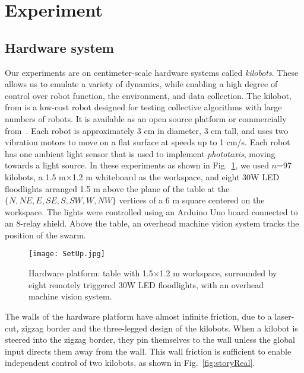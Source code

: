 
\section{Experiment}\label{sec:expResults}



\subsection{Hardware system}


Our experiments are on centimeter-scale hardware systems called \emph{kilobots}.  These allows us to emulate a variety of dynamics, while enabling a high degree of control over robot function, the environment, and data collection. The kilobot, from \citet{Rubenstein2012,rubenstein2014programmable} is a low-cost robot designed for testing collective algorithms with large numbers of robots. It is available as an open source platform or commercially from~\citet{K-Team2015}.  Each robot is approximately 3 cm in diameter, 3 cm tall, and uses two vibration motors to move on a flat surface at speeds up to 1 cm/s.  Each robot has one ambient light sensor that is used to implement \emph{phototaxis},  moving towards a light source. 
In these experiments as shown in Fig.~\ref{fig:setup}, we used $n$=97 kilobots, a 1.5 m$\times$1.2 m whiteboard as the workspace, and eight 30W LED floodlights arranged 1.5 m above the plane of the table at the $\{N,NE,E,SE,S,SW,W,NW\}$ vertices of a 6 m square centered on the workspace. The lights were controlled using an Arduino Uno board connected to an 8-relay shield.  Above  the table, an overhead machine vision system tracks the position of the swarm.


\begin{figure}
\begin{center}
	\texttt{[image: SetUp.jpg]}
\end{center}
\vspace{-1em}
\caption{\label{fig:setup}
Hardware platform:  table with 1.5$\times$1.2 m workspace, surrounded by eight remotely triggered 30W LED floodlights, with an overhead machine vision system.
}
\end{figure}

The walls of the hardware platform have almost infinite friction, due to a laser-cut, zigzag border and the three-legged design of the kilobots. When a kilobot is steered into the zigzag border, they pin themselves to the wall unless the global input directs them away from the wall.  This wall friction is sufficient to enable independent control of two kilobots, as shown in Fig.~\ref{fig:storyReal}.



